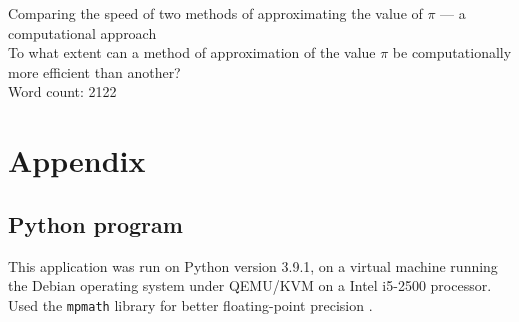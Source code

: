 \documentclass[12pt,a4paper]{article}
\begin{document}
\doublespacing %



\begin{titlepage}
    \begin{center}
    \vspace*{4cm}
        Comparing the speed of two methods of approximating the value of $\pi$ ---
        a computational approach\\
    \vspace{1cm}
    To what extent can a method of approximation of the value $\pi$ be computationally more efficient than another? \\
    \vspace{4cm}
    Word count: 2122
    \vfill
    \vspace{0.1cm}
    \end{center}
    \end{titlepage}



\begin{center}
\tableofcontents
\vspace{1in}

\end{center}



\newpage















\printbibliography[heading=bibintoc, title=Works Cited]

\appendix
\section{Appendix}
\label{app}
\subsection{Python program}
\label{app:scripts}
This application was run on Python version 3.9.1, on a virtual machine 
running the Debian operating system under QEMU/KVM on a Intel i5-2500 
processor. Used the \verb|mpmath| library for better floating-point 
precision \cite{mpmath}. 

\end{document}
